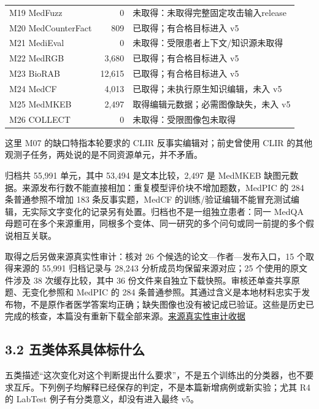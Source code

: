 \documentclass[
  11pt,
  a4paper,
]{article}
\begin{document}
{\begin{longtable}[]{@{}lrl@{}}
M19 MedFuzz & 0 & 未取得：未取得完整固定攻击输入release \\
M20 MedCounterFact & 809 & 已取得；有合格目标进入 v5 \\
M21 MediEval & 0 & 未取得：受限患者上下文/知识源未取得 \\
M22 MedRGB & 3,680 & 已取得；有合格目标进入 v5 \\
M23 BioRAB & 12,615 & 已取得；有合格目标进入 v5 \\
M24 MedCF & 4,013 & 已取得；未执行原生知识编辑，未入 v5 \\
M25 MedMKEB & 2,497 & 取得编辑元数据；必需图像缺失，未入 v5 \\
M26 COLLECT & 0 & 未取得：受限图像包未取得 \\
\end{longtable}
}

这里 M07 的缺口特指本轮要求的 CLIR 反事实编辑对；前史曾使用 CLIR
的其他观测子任务，两处说的是不同资源单元，并不矛盾。

归档共 55,991 单元，其中 53,494 是文本比较，2,497 是 MedMKEB
缺图元数据。来源发布行数不能直接相加：重复模型评价块不增加题数，MedPIC
的 284 条普通参照不增加 183 条反事实题，MedCF
的训练/验证编辑不能冒充测试编辑，无实际文字变化的记录另有处置。归档也不是一组独立患者：同一
MedQA
母题可在多个来源重用，同根多个变体、同一研究的多个问句或同一前提的多个假说相互关联。

取得之后另做来源真实性审计：核对 26 个候选的论文---作者---发布入口，15
个取得来源的 55,991 归档记录与 28,243 分析成员均保留来源对应；25
个使用的原文件涉及 38 次缓存比较，其中 36
份文件来自独立下载快照。审核还单查共享原题、无变化参照和 MedPIC 的 284
条普通参照。其通过含义是本地材料忠实于发布物，不是原作者医学答案均正确；缺失图像也没有被记成已验证。这些是历史已完成的核查，本篇没有重新下载全部来源。\href{https://github.com/xiotakut/cf_mrg/blob/main/papers/2026-10-02_cf_moa/author_dossier/sources/0ea9469be785_summary.json}{来源真实性审计收据}

\subsection{3.2
五类体系具体标什么}\label{ux4e94ux7c7bux4f53ux7cfbux5177ux4f53ux6807ux4ec0ux4e48}

五类描述``这次变化对这个判断提出什么要求''，不是五个训练出的分类器，也不要求互斥。下列例子均解释已经保存的判定，不是本篇新增病例或新实验；尤其
R4 的 LabTest 例子有分类意义，却没有进入最终 v5。
\end{document}
